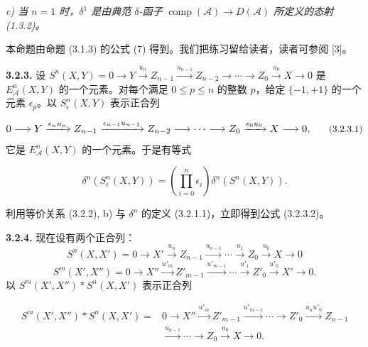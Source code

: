 \clearpage
{}%
\begingroup\small\setlength{\parskip}{0pt}\setlength{\emergencystretch}{1.5em}
\setlength{\abovedisplayskip}{4pt plus 2pt minus 2pt}%
\setlength{\belowdisplayskip}{4pt plus 2pt minus 2pt}%

\noindent\textit{c) 当 $n=1$ 时，$\delta^1$ 是由典范 $\delta$-函子
$\operatorname{comp}(\mathcal A)\longrightarrow D(\mathcal A)$
所定义的态射 (1.3.2)。}

本命题由命题 (3.1.3) 的公式 (7) 得到。我们把练习留给读者，读者可参阅 [3]。

\medskip\noindent\textbf{3.2.3.}\quad
设
$S^n(X,Y)=0\longrightarrow Y\xrightarrow{u_n}Z_{n-1}
\xrightarrow{u_{n-1}}Z_{n-2}\longrightarrow\cdots\longrightarrow Z_0
\xrightarrow{u_0}X\longrightarrow0$
是 $E_{\mathcal A}^{n}(X,Y)$ 的一个元素。对每个满足
$0\leq p\leq n$ 的整数 $p$，给定 $\{-1,+1\}$ 的一个元素
$\epsilon_p$。以 $S_{\epsilon}^{n}(X,Y)$ 表示正合列

\begin{equation}
\resizebox{0.94\textwidth}{!}{$\displaystyle
0\longrightarrow Y\xrightarrow{\epsilon_nu_n}Z_{n-1}
\xrightarrow{\epsilon_{n-1}u_{n-1}}Z_{n-2}\longrightarrow\cdots
\longrightarrow Z_0\xrightarrow{\epsilon_0u_0}X\longrightarrow0,
$}
\tag{3.2.3.1}
\end{equation}
它是 $E_{\mathcal A}^{n}(X,Y)$ 的一个元素。于是有等式

\begin{equation}
\delta^n(S_{\epsilon}^{n}(X,Y))=
\left(\prod_{i=0}^{n}\epsilon_i\right)\delta^n(S^n(X,Y)).
\tag{3.2.3.2}
\end{equation}

利用等价关系 (3.2.2), b) 与 $\delta^n$ 的定义 (3.2.1.1)，立即得到公式
(3.2.3.2)。

\medskip\noindent\textbf{3.2.4.}\quad
现在设有两个正合列：
\[
S^n(X,X')=0\longrightarrow X'\xrightarrow{u_n}Z_{n-1}
\xrightarrow{u_{n-1}}\cdots\xrightarrow{u_1}Z_0
\xrightarrow{u_0}X\longrightarrow0
\]
\[
S^m(X',X'')=0\longrightarrow X''\xrightarrow{u'_m}Z'_{m-1}
\xrightarrow{u'_{m-1}}\cdots\xrightarrow{u'_1}Z'_0
\xrightarrow{u'_0}X'\longrightarrow0.
\]
以 $S^m(X',X'')*S^n(X,X')$ 表示正合列

\begin{equation}
\begin{aligned}
S^m(X',X'')*S^n(X,X')={}&
0\longrightarrow X''\xrightarrow{u'_m}Z'_{m-1}
\xrightarrow{u'_{m-1}}\cdots\longrightarrow Z'_0
\xrightarrow{u_nu'_0}Z_{n-1}\\
&\xrightarrow{u_{n-1}}\cdots\longrightarrow Z_0
\xrightarrow{u_0}X\longrightarrow0.
\end{aligned}
\tag{3.2.4.1}
\end{equation}

